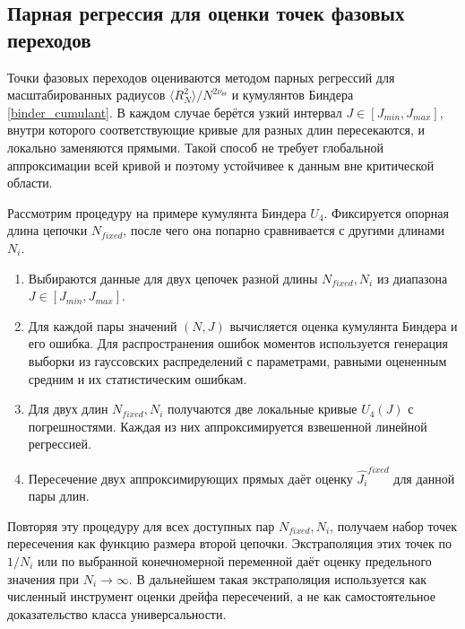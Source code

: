 \subsection{Парная регрессия для оценки точек фазовых переходов}


\label{subsection:paired_regression} 
 Точки фазовых переходов оцениваются методом парных регрессий для масштабированных радиусов $ \langle R_N^2\rangle/N^{2\nu_\Theta} $ и кумулянтов Биндера \eqref{binder_cumulant}. 
 В каждом случае берётся узкий интервал $J \in [J_{min}, J_{max}]$, внутри которого соответствующие кривые для разных длин пересекаются, и локально заменяются прямыми. 
 Такой способ не требует глобальной аппроксимации всей кривой и поэтому устойчивее к данным вне критической области.

Рассмотрим процедуру на примере кумулянта Биндера $U_4$. 
Фиксируется опорная длина цепочки $N_{fixed}$, после чего она попарно сравнивается с другими длинами $N_i$. 

 \begin{enumerate} 
 	
	 	\item  Выбираются данные для двух цепочек разной длины $N_{fixed}, N_i$ из диапазона $J \in [J_{min}, J_{max}]$. 
	 	\item Для каждой пары значений $(N,J)$ вычисляется оценка кумулянта Биндера и его ошибка. 
	 	Для распространения ошибок моментов используется генерация выборки из гауссовских распределений с параметрами, равными оцененным средним и их статистическим ошибкам. 
	 	
	 	\item  Для двух длин $N_{fixed}, N_i$ получаются две локальные кривые $U_4(J)$ с погрешностями.  Каждая из них аппроксимируется взвешенной линейной регрессией.
	 	
		\item   Пересечение двух аппроксимирующих прямых даёт оценку $\hat{J_i}^{fixed}$ для данной пары длин.
 	
  \end{enumerate}

Повторяя эту процедуру для всех доступных пар $N_{fixed},N_i$, получаем набор точек пересечения как функцию размера второй цепочки. 
Экстраполяция этих точек по $1/N_i$ или по выбранной конечномерной переменной даёт оценку предельного значения при $N_i\to\infty$. 
В дальнейшем такая экстраполяция используется как численный инструмент оценки дрейфа пересечений, а не как самостоятельное доказательство класса универсальности.

  
